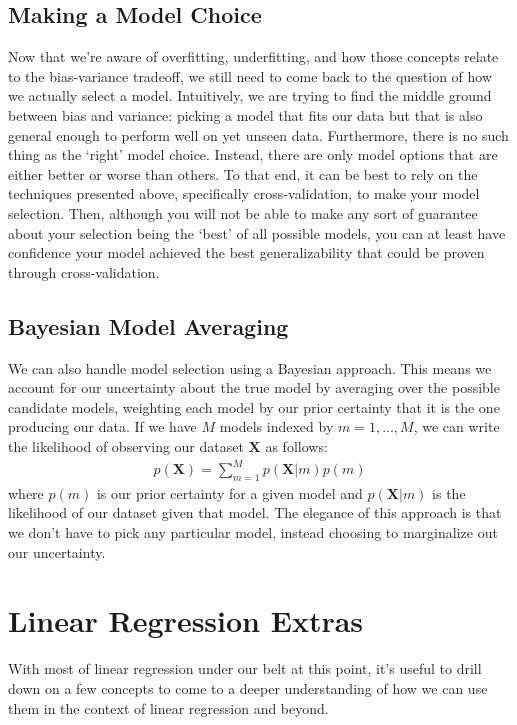 \subsection{Making a Model Choice}
Now that we're aware of overfitting, underfitting, and how those concepts relate to the bias-variance tradeoff, we still need to come back to the question of how we actually select a model. Intuitively, we are trying to find the middle ground between bias and variance: picking a model that fits our data but that is also general enough to perform well on yet unseen data. Furthermore, there is no such thing as the `right' model choice. Instead, there are only model options that are either better or worse than others. To that end, it can be best to rely on the techniques presented above, specifically cross-validation, to make your model selection. Then, although you will not be able to make any sort of guarantee about your selection being the `best' of all possible models, you can at least have confidence your model achieved the best generalizability that could be proven through cross-validation.

\subsection{Bayesian Model Averaging}
We can also handle model selection using a Bayesian approach. This means we account for our uncertainty about the true model by averaging over the possible candidate models, weighting each model by our prior certainty that it is the one producing our data. If we have $M$ models indexed by $m = 1, ..., M$, we can write the likelihood of observing our dataset $\mathbf{X}$ as follows:
\begin{align*}
    p(\mathbf{X}) = \sum_{m=1}^{M} p(\mathbf{X}|m)p(m)
\end{align*}
where $p(m)$ is our prior certainty for a given model and $p(\mathbf{X}|m)$ is the likelihood of our dataset given that model. The elegance of this approach is that we don't have to pick any particular model, instead choosing to marginalize out our uncertainty.

\section{Linear Regression Extras}
With most of linear regression under our belt at this point, it's useful to drill down on a few concepts to come to a deeper understanding of how we can use them in the context of linear regression and beyond.

